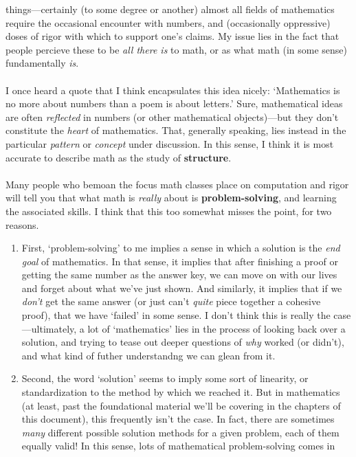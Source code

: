\documentclass[10pt]{article}
\theoremstyle{definition}
\begin{document}
{things---certainly (to some degree or another) almost all fields of
mathematics require the occasional encounter with numbers, and
(occasionally oppressive) doses of rigor with which to support one's
claims.  My issue lies in the fact that people percieve these to be
\emph{all there is} to math, or as what math (in some sense)
fundamentally \emph{is}.\\~\\
I once heard a quote that I think encapsulates this idea nicely:
`Mathematics is no more about numbers than a poem is about letters.'
Sure, mathematical ideas are often \emph{reflected} in numbers (or
other mathematical objects)---but they don't constitute the
\emph{heart} of mathematics.  That, generally speaking, lies instead
in the particular \emph{pattern} or \emph{concept} under discussion.
In this sense, I think it is most accurate to describe math as the
study of \textbf{structure}.  \\~\\
Many people who bemoan the focus math classes place on computation and
rigor will tell you that what math is \emph{really} about is
\textbf{problem-solving}, and learning the associated skills.  I think
that this too somewhat misses the point, for two reasons.
\begin{enumerate}
\item First, `problem-solving' to me implies a sense in which a
  solution is the \emph{end goal} of mathematics.  In that sense, it
  implies that after finishing a proof or getting the same number as
  the answer key, we can move on with our lives and forget about what
  we've just shown.  And similarly, it implies that if we \emph{don't}
  get the same answer (or just can't \emph{quite} piece together a
  cohesive proof), that we have `failed' in some sense.  I don't think
  this is really the case---ultimately, a lot of `mathematics' lies in
  the process of looking back over a solution, and trying to tease out
  deeper questions of \emph{why} worked (or didn't), and what kind of
  futher understandng we can glean from it.
\item Second, the word `solution' seems to imply some sort of
  linearity, or standardization to the method by which we reached it.
  But in mathematics (at least, past the foundational material we'll
  be covering in the chapters of this document), this frequently isn't
  the case.  In fact, there are sometimes \emph{many} different
  possible solution methods for a given problem, each of them equally
  valid!  In this sense, lots of mathematical problem-solving comes in

\end{enumerate}}
\end{document}
